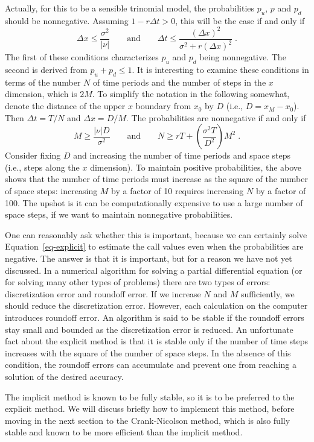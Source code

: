 \documentclass[
  letterpaper,
  DIV=11,
  numbers=noendperiod]{scrartcl}
\theoremstyle{definition}
\theoremstyle{remark}
\begin{document}
Actually, for this to be a sensible trinomial model, the probabilities
\(p_u\), \(p\) and \(p_d\) should be nonnegative. Assuming
\(1-r\Delta t>0\), this will be the case if and only if \[
\Delta x \leq  \frac{\sigma^2}{|\nu|} \qquad \text{and} \qquad \Delta t \leq \frac{(\Delta x)^2}{\sigma^2 + r(\Delta x)^2}\;.
\] The first of these conditions characterizes \(p_u\) and \(p_d\) being
nonnegative. The second is derived from \(p_u+p_d \leq 1\). It is
interesting to examine these conditions in terms of the number \(N\) of
time periods and the number of steps in the \(x\) dimension, which is
\(2M\). To simplify the notation in the following somewhat, denote the
distance of the upper \(x\) boundary from \(x_0\) by \(D\) (i.e.,
\(D=x_M-x_0\)). Then \(\Delta t=T/N\) and \(\Delta x = D/M\). The
probabilities are nonnegative if and only if \[
M \geq \frac{|\nu| D}{\sigma^2} \qquad \text{and} \qquad N \geq rT + \left(\frac{\sigma^2T}{D^2}\right)M^2\;.
\] Consider fixing \(D\) and increasing the number of time periods and
space steps (i.e., steps along the \(x\) dimension). To maintain
positive probabilities, the above shows that the number of time periods
must increase as the square of the number of space steps: increasing
\(M\) by a factor of 10 requires increasing \(N\) by a factor of 100.
The upshot is it can be computationally expensive to use a large number
of space steps, if we want to maintain nonnegative probabilities.

One can reasonably ask whether this is important, because we can
certainly solve Equation~\ref{eq-explicit} to estimate the call values
even when the probabilities are negative. The answer is that it is
important, but for a reason we have not yet discussed. In a numerical
algorithm for solving a partial differential equation (or for solving
many other types of problems) there are two types of errors:
discretization error and roundoff error. If we increase \(N\) and \(M\)
sufficiently, we should reduce the discretization error. However, each
calculation on the computer introduces roundoff error. An algorithm is
said to be stable if the  roundoff errors stay
small and bounded as the discretization error is reduced. An unfortunate
fact about the explicit method is that it is stable only if the number
of time steps increases with the square of the number of space steps. In
the absence of this condition, the roundoff errors can accumulate and
prevent one from reaching a solution of the desired accuracy.

The implicit method is known to be fully stable, so it is to be
preferred to the explicit method. We will discuss briefly how to
implement this method, before moving in the next section to the
Crank-Nicolson method, which is also fully stable and known to be more
efficient than the implicit method.
\end{document}
